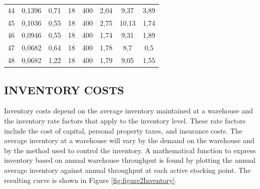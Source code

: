 \documentclass[12pt,a4paper]{article}
\begin{document}
\begin{table}[]
{\begin{tabular}{|c|c|c|c|c|c|c|c|}
    44                       & 0,1396                 & 0,71                       & 18                                         & 400                       & 2,04                                            & 9,37                                     & 3,89                                  \\
    45                       & 0,1036                 & 0,55                       & 18                                         & 400                       & 2,75                                            & 10,13                                    & 1,74                                  \\
    46                       & 0,0946                 & 0,55                       & 18                                         & 400                       & 1,74                                            & 9,31                                     & 1,89                                  \\
    47                       & 0,0682                 & 0,64                       & 18                                         & 400                       & 1,78                                            & 8,7                                      & 0,5                                   \\
    48                       & 0,0682                 & 1,22                       & 18                                         & 400                       & 1,79                                            & 9,05                                     & 1,55 \\
    \hline
\end{tabular}%
}
\end{table}

\subsection{INVENTORY COSTS}

Inventory costs depend on the average inventory maintained at a warehouse and the inventory rate factors that apply to the inventory level.
These rate factors include the cost of capital, personal property taxes, and insurance costs.
The average inventory at a warehouse will vary by the demand on the warehouse and by the method used to control the inventory.
A mathematical function to express inventory based on annual warehouse throughput is found by plotting the annual average inventory against annual throughput at each active stocking point.
The resulting curve is shown in Figure \ref{fig:figure2Inventory}.
\end{document}
